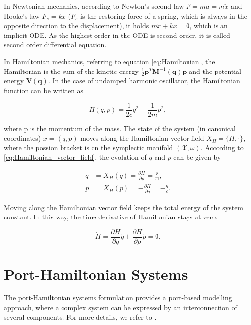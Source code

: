 \documentclass[
	parskip, 			   %
	twoside, 			   %
	DIV=14, 			   %
	BCOR=15.0mm, 		   %
	headsepline, 		   %
	open=right, 		   %
	captions=tableheading, %
	bibliography=totoc,    %
	numbers=noenddot       %
]{scrreprt}
\begin{document}
In Newtonian mechanics, according to Newton's second law $F=ma=m\ddot{x}$ and Hooke's law $F_s=kx$ ($F_s$ is the restoring force of a spring, which is always in the opposite direction to the displacement), it holds $m\ddot{x}+kx=0$, which is an implicit ODE. As the highest order in the ODE is second order, it is called second order differential equation.

In Hamiltonian mechanics, referring to equation \ref{eq:Hamiltonian}, the Hamiltonian is the sum of the kinetic energy $\frac{1}{2}\mathbf{p}^T\mathbf{M}^{-1}(\mathbf{q})\mathbf{p}$ and the potential energy $\mathbf{V}(\mathbf{q})$. In the case of undamped harmonic oscillator, the Hamiltonian function can be written as

\begin{equation}
    \label{eq:Hamiltonian_udho}
    H(q,p)=\frac{1}{2c}q^2+\frac{1}{2m}p^2,
\end{equation}

where p is the momentum of the mass. The state of the system (in canonical coordinates) $x=(q,p)$ moves along the Hamiltonian vector field $X_{H}=\{H, \cdot\}$, where the possion bracket is on the symplectic manifold $(\mathcal{X},\omega)$. According to \ref{eq:Hamiltonian_vector_field}, the evolution of $q$ and $p$ can be given by

\begin{equation}
    \label{eq:ODE_undamped_harmonic_oscillator}
    \begin{aligned}
        \dot{q}&=X_{H}(q)=\frac{\partial H}{\partial p}=\frac{p}{m},\\
        \dot{p}&=X_{H}(p)=-\frac{\partial H}{\partial q}=-\frac{q}{c}.
    \end{aligned}
\end{equation}

Moving along the Hamiltonian vector field keeps the total energy of the system constant. In this way, the time derivative of Hamiltonian stays at zero:

\begin{equation}
    \label{eq:derivative_Hamiltonian}
    \dot{H}=\frac{\partial H}{\partial q}\dot{q}+\frac{\partial H}{\partial p}\dot{p}=0.
\end{equation}


\section{Port-Hamiltonian Systems}
The port-Hamiltonian systems formulation provides a port-based modelling approach, where a complex system can be expressed by an interconnection of several components. For more details, we refer to \cite{van2014port}.
\end{document}
